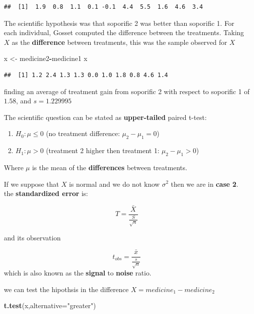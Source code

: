 \documentclass[
]{book}
\newenvironment{Shaded}{\begin{snugshade}}{\end{snugshade}}
\newcommand{\AttributeTok}[1]{\textcolor[rgb]{0.13,0.29,0.53}{#1}}
\newcommand{\FunctionTok}[1]{\textcolor[rgb]{0.13,0.29,0.53}{\textbf{#1}}}
\newcommand{\NormalTok}[1]{#1}
\newcommand{\OtherTok}[1]{\textcolor[rgb]{0.56,0.35,0.01}{#1}}
\newcommand{\SpecialCharTok}[1]{\textcolor[rgb]{0.81,0.36,0.00}{\textbf{#1}}}
\newcommand{\StringTok}[1]{\textcolor[rgb]{0.31,0.60,0.02}{#1}}
\providecommand{\tightlist}{%
  \setlength{\itemsep}{0pt}\setlength{\parskip}{0pt}}
\begin{document}
\begin{verbatim}
##  [1]  1.9  0.8  1.1  0.1 -0.1  4.4  5.5  1.6  4.6  3.4
\end{verbatim}

The scientific hypothesis was that soporific 2 was better than soporific 1. For each individual, Gosset computed the difference between the treatments. Taking \(X\) as the \textbf{difference} between treatments, this was the sample observed for \(X\)

\begin{Shaded}
\begin{Highlighting}[]
\NormalTok{x }\OtherTok{\textless{}{-}}\NormalTok{ medicine2}\SpecialCharTok{{-}}\NormalTok{medicine1}
\NormalTok{x}
\end{Highlighting}
\end{Shaded}

\begin{verbatim}
##  [1] 1.2 2.4 1.3 1.3 0.0 1.0 1.8 0.8 4.6 1.4
\end{verbatim}

finding an average of treatment gain from soporific 2 with respect to soporific 1 of \(1.58\), and \(s=1.229995\)

The scientific question can be stated as \textbf{upper-tailed} paired t-test:

\begin{enumerate}
\def\labelenumi{\alph{enumi}.}
\tightlist
\item
  \(H_0:\mu \leq 0\) (no treatment difference: \(\mu_2-\mu_1=0\))
\item
  \(H_1:\mu > 0\) (treatment 2 higher then treatment 1: \(\mu_2-\mu_1>0\))
\end{enumerate}

Where \(\mu\) is the mean of the \textbf{differences} between treatments.

If we suppose that \(X\) is normal and we do not know \(\sigma^2\) then we are in \textbf{case 2}. the \textbf{standardized error} is:

\[T=\frac{\bar{X}}{\frac{S}{\sqrt{n}}}\]

and its observation

\[t_{obs}=\frac{\bar{x}}{\frac{s}{\sqrt{n}}}\]
which is also known as the \textbf{signal} to \textbf{noise} ratio.

we can test the hipothsis in the difference \(X=medicine_1-medicine_2\)

\begin{Shaded}
\begin{Highlighting}[]
\FunctionTok{t.test}\NormalTok{(x,}\AttributeTok{alternative=}\StringTok{"greater"}\NormalTok{)}
\end{Highlighting}
\end{Shaded}
\end{document}
